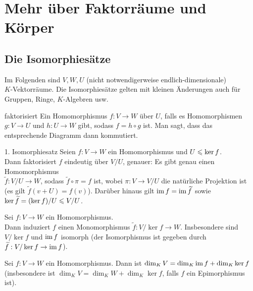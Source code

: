 \section{%
    Mehr über Faktorräume und Körper%
}

\subsection{%
    Die Isomorphiesätze%
}

\begin{Bem}
    Im Folgenden sind $V, W, U$ (nicht notwendigerweise endlich-dimensionale)\\
    $K$-Vektorräume.
    Die Isomorphiesätze gelten mit kleinen Änderungen auch für
    Gruppen, Ringe, $K$-Algebren usw.
\end{Bem}

\begin{Def}{faktorisiert}
    Ein Homomorphismus $f: V \rightarrow W$  über $U$,
    falls es Homomorphismen $g: V \rightarrow U$ und $h: U \rightarrow W$
    gibt, sodass $f = h \circ g$ ist.
    Man sagt, dass das entsprechende Diagramm dann kommutiert.
\end{Def}

\begin{Satz}{1. Isomorphiesatz}
    Seien $f: V \rightarrow W$ ein Homomorphismus und $U \leqslant \ker f$. \\
    Dann faktorisiert $f$ eindeutig über $V/U$, genauer:
    Es gibt genau einen Homomorphismus \\
    $\widetilde{f}: V/U \rightarrow W$,
    sodass $\widetilde{f} \circ \pi = f$ ist, wobei $\pi: V \rightarrow V/U$
    die natürliche Projektion ist
    (es gilt $\widetilde{f}(v + U) = f(v)$).
    Darüber hinaus gilt $\operatorname{im} f = \operatorname{im} \widetilde{f}$
    sowie $\ker \widetilde{f} = (\ker f)/U \leqslant V/U$.
\end{Satz}

\begin{Kor}
    Sei $f: V \rightarrow W$ ein Homomorphismus. \\
    Dann induziert $f$ einen Monomorphismus
    $\widetilde{f}: V/\ker f \rightarrow W$.
    Insbesondere sind $V/\ker f$ und $\operatorname{im} f$ isomorph (der Isomorphismus
    ist gegeben durch $\widetilde{f}: V/\ker f \rightarrow \operatorname{im} f$).
\end{Kor}

\begin{Kor}
    Sei $f: V \rightarrow W$ ein Homomorphismus.
    Dann ist $\dim_K V = \dim_K \operatorname{im} f + \dim_K \ker f$
    (insbesondere ist $\dim_K V = \dim_K W + \dim_K \ker f$, falls $f$ ein
    Epimorphismus ist).
\end{Kor}


